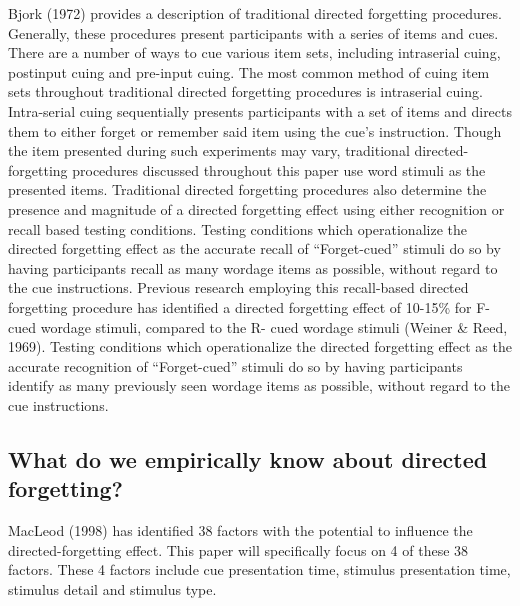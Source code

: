 \documentclass[
  english,
  man,floatsintext]{apa6}
\begin{document}
Bjork (1972) provides a description of traditional directed forgetting procedures. Generally, these procedures present participants with a series of items and cues. There are a number of ways to cue various item sets, including intraserial cuing, postinput cuing and pre-input cuing. The most common method of cuing item sets throughout traditional directed forgetting procedures is intraserial cuing. Intra-serial cuing sequentially presents participants with a set of items and directs them to either forget or remember said item using the cue's instruction. Though the item presented during such experiments may vary, traditional directed-forgetting procedures discussed throughout this paper use word stimuli as the presented items.
Traditional directed forgetting procedures also determine the presence and magnitude of a directed forgetting effect using either recognition or recall based testing conditions. Testing conditions which operationalize the directed forgetting effect as the accurate recall of \enquote{Forget-cued} stimuli do so by having participants recall as many wordage items as possible, without regard to the cue instructions. Previous research employing this recall-based directed forgetting procedure has identified a directed forgetting effect of 10-15\% for F- cued wordage stimuli, compared to the R- cued wordage stimuli (Weiner \& Reed, 1969). Testing conditions which operationalize the directed forgetting effect as the accurate recognition of \enquote{Forget-cued} stimuli do so by having participants identify as many previously seen wordage items as possible, without regard to the cue instructions.

\hypertarget{what-do-we-empirically-know-about-directed-forgetting}{%
\subsection{What do we empirically know about directed forgetting?}\label{what-do-we-empirically-know-about-directed-forgetting}}

MacLeod (1998) has identified 38 factors with the potential to influence the directed-forgetting effect. This paper will specifically focus on 4 of these 38 factors. These 4 factors include cue presentation time, stimulus presentation time, stimulus detail and stimulus type.
\end{document}
